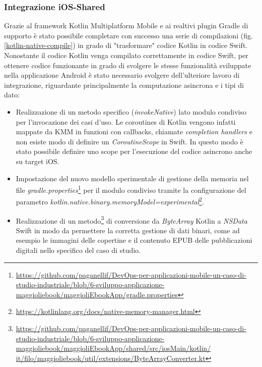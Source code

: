 \subsubsection*{Integrazione iOS-Shared}
Grazie al framework Kotlin Multiplatform Mobile e ai realtivi plugin Gradle di supporto è stato possibile completare con successo una serie di compilazioni (fig. \ref{kotlin-native-compile}) in grado di "trasformare" codice Kotlin in codice Swift. Nonostante il codice Kotlin venga compilato correttamente in codice Swift, per ottenere codice funzionante in grado di svolgere le stesse funzionalità sviluppate nella applicazione Android è stato necessario svolgere dell'ulteriore lavoro di integrazione, riguardante principalmente la computazione asincrona e i tipi di dato:

\begin{itemize}
    \item Realizzazione di un metodo specifico (\textit{invokeNative}) lato modulo condiviso per l'invocazione dei casi d'uso. Le coroutines di Kotlin vengono infatti mappate da KMM in funzioni con callbacks, chiamate \textit{completion handlers} e non esiste modo di definire un \textit{CoroutineScope} in Swift. In questo modo è stato possibile definire uno scope per l'esecuzione del codice asincrono anche su target iOS.
    \item Impostazione del nuovo modello sperimentale di gestione della memoria nel file \textit{gradle.properties}\footnote{\href{https://github.com/paganellif/DevOps-per-applicazioni-mobile-un-caso-di-studio-industriale/blob/6-sviluppo-applicazione-maggioliebook/maggioliEbookApp/gradle.properties}{https://github.com/paganellif/DevOps-per-applicazioni-mobile-un-caso-di-studio-industriale/blob/6-sviluppo-applicazione-maggioliebook/maggioliEbookApp/gradle.properties}} per il modulo condiviso tramite la configurazione del parametro \textit{kotlin.native.binary.memoryModel=experimental}\footnote{\href{https://kotlinlang.org/docs/native-memory-manager.html}{https://kotlinlang.org/docs/native-memory-manager.html}}.
    \item Realizzazione di un metodo\footnote{\href{https://github.com/paganellif/DevOps-per-applicazioni-mobile-un-caso-di-studio-industriale/blob/6-sviluppo-applicazione-maggioliebook/maggioliEbookApp/shared/src/iosMain/kotlin/it/filo/maggioliebook/util/extensions/ByteArrayConverter.kt}{https://github.com/paganellif/DevOps-per-applicazioni-mobile-un-caso-di-studio-industriale/blob/6-sviluppo-applicazione-maggioliebook/maggioliEbookApp/shared/src/iosMain/kotlin/\\it/filo/maggioliebook/util/extensions/ByteArrayConverter.kt}} di conversione da \textit{ByteArray} Kotlin a \textit{NSData} Swift in modo da permettere la corretta gestione di dati binari, come ad esempio le immagini delle copertine e il contenuto EPUB delle pubblicazioni digitali nello specifico del caso di studio.

\end{itemize}
